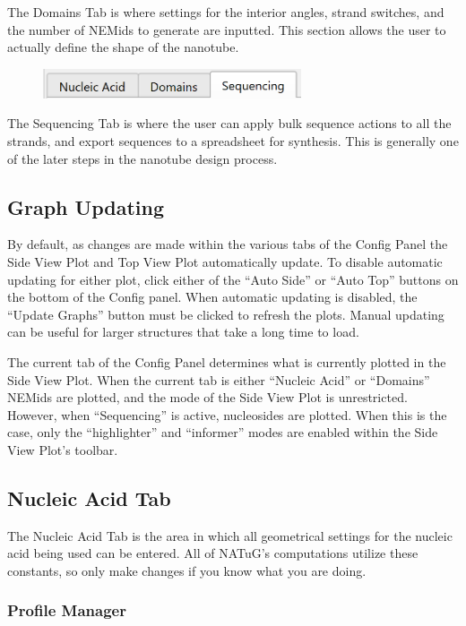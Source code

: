 \documentclass[titlepage]{article}
\begin{document}
	The Domains Tab is where settings for the interior angles, strand switches, and the number of NEMids to generate are inputted. This section allows the user to actually define the shape of the nanotube.

	\begin{figure}[h]
		\centering
		\includegraphics[width=3in]{"sequencing-tab-activated.png"}
		\label{fig:sequencing-activated}
	\end{figure}

	The Sequencing Tab is where the user can apply bulk sequence actions to all the strands, and export sequences to a spreadsheet for synthesis. This is generally one of the later steps in the nanotube design process.
	
	\subsection{Graph Updating}
	
	By default, as changes are made within the various tabs of the Config Panel the Side View Plot and Top View Plot automatically update. To disable automatic updating for either plot, click either of the “Auto Side” or “Auto Top” buttons on the bottom of the Config panel. When automatic updating is disabled, the “Update Graphs” button must be clicked to refresh the plots. Manual updating can be useful for larger structures that take a long time to load.
	
	The current tab of the Config Panel determines what is currently plotted in the Side View Plot. When the current tab is either “Nucleic Acid” or “Domains” NEMids are plotted, and the mode of the Side View Plot is unrestricted. However, when “Sequencing” is active, nucleosides are plotted. When this is the case, only the “highlighter” and “informer” modes are enabled within the Side View Plot’s toolbar.
	
	\subsection{Nucleic Acid Tab}
	
	The Nucleic Acid Tab is the area in which all geometrical settings for the nucleic acid being used can be entered. All of NATuG’s computations utilize these constants, so only make changes if you know what you are doing.
	
	\subsubsection{Profile Manager}
	
\end{document}
